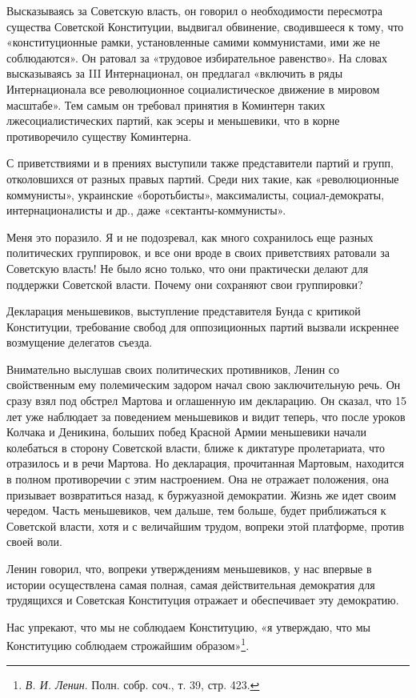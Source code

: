 \documentclass[12pt, a4paper, openany]{book}
\begin{document}
Высказываясь за Советскую власть, он говорил о необходимости пересмотра существа Советской Конституции, выдвигал обвинение, сводившееся к тому, что «конституционные рамки, установленные самими коммунистами, ими же не соблюдаются». Он ратовал за «трудовое избирательное равенство». На словах высказываясь за III Интернационал, он предлагал «включить в ряды Интернационала все революционное социалистическое движение в мировом масштабе». Тем самым он требовал принятия в Коминтерн таких лжесоциалистических партий, как эсеры и меньшевики, что в корне противоречило существу Коминтерна.

С приветствиями и в прениях выступили также представители партий и групп, отколовшихся от разных правых партий. Среди них такие, как «революционные коммунисты», украинские «боротьбисты», максималисты, социал-демократы, интернационалисты и др., даже «сектанты-коммунисты».

Меня это поразило. Я и не подозревал, как много сохранилось еще разных политических группировок, и все они вроде в своих приветствиях ратовали за Советскую власть! Не было ясно только, что они практически делают для поддержки Советской власти. Почему они сохраняют свои группировки?

Декларация меньшевиков, выступление представителя Бунда с критикой Конституции, требование свобод для оппозиционных партий вызвали искреннее возмущение делегатов съезда.

Внимательно выслушав своих политических противников, Ленин со свойственным ему полемическим задором начал свою заключительную речь. Он сразу взял под обстрел Мартова и оглашенную им декларацию. Он сказал, что 15 лет уже наблюдает за поведением меньшевиков и видит теперь, что после уроков Колчака и Деникина, больших побед Красной Армии меньшевики начали колебаться в сторону Советской власти, ближе к диктатуре пролетариата, что отразилось и в речи Мартова. Но декларация, прочитанная Мартовым, находится в полном противоречии с этим настроением. Она не отражает положения, она призывает возвратиться назад, к буржуазной демократии. Жизнь же идет своим чередом. Часть меньшевиков, чем дальше, тем больше, будет приближаться к Советской власти, хотя и с величайшим трудом, вопреки этой платформе, против своей воли.

Ленин говорил, что, вопреки утверждениям меньшевиков, у нас впервые в истории осуществлена самая полная, самая действительная демократия для трудящихся и Советская Конституция отражает и обеспечивает эту демократию.

Нас упрекают, что мы не соблюдаем Конституцию, «я утверждаю, что мы Конституцию соблюдаем строжайшим образом»\footnote{\textit{В. И. Ленин}. Полн. собр. соч., т. 39, стр. 423.}.
\end{document}
